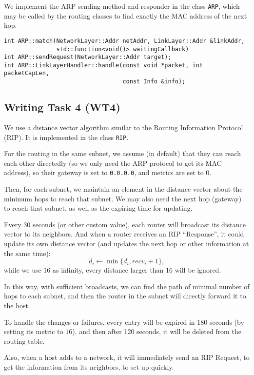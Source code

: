 \documentclass[a4paper]{article}
\begin{document}
  We implement the ARP sending method and responder in the class \texttt{ARP}, which may be called by the routing classes to find exactly the MAC address of the next hop.
  \begin{verbatim}
int ARP::match(NetworkLayer::Addr netAddr, LinkLayer::Addr &linkAddr,
               std::function<void()> waitingCallback)
int ARP::sendRequest(NetworkLayer::Addr target);
int ARP::LinkLayerHandler::handle(const void *packet, int packetCapLen,
                                  const Info &info);
  \end{verbatim}

  \subsection{Writing Task 4 (WT4)}
  
  We use a distance vector algorithm similar to the Routing Information Protocol (RIP). It is implemented in the class \texttt{RIP}.

  For the routing in the same subnet, we assume (in default) that they can reach each other directedly (so we only need the ARP protocol to get its MAC address), so their gateway is set to \texttt{0.0.0.0}, and metrics are set to $0$.

  Then, for each subnet, we maintain an element in the distance vector about the minimum hops to reach that subnet.
  We may also need the next hop (gateway) to reach that subnet, as well as the expiring time for updating.

  Every 30 seconds (or other custom value), each router will broadcast its distance vector to its neighbors.
  And when a router receives an RIP ``Response'', it could update its own distance vector (and updates the next hop or other information at the same time):
  $$d_i \gets \min\{d_i, \mathit{recv}_i + 1\},$$
  while we use $16$ as infinity, every distance larger than $16$ will be ignored.

  In this way, with sufficient broadcasts, we can find the path of minimal number of hops to each subnet, and then the router in the subnet will directly forward it to the host.

  To handle the changes or failures, every entry will be expired in 180 seconds (by setting its metric to $16$), and then after 120 seconds, it will be deleted from the routing table.

  Also, when a host adds to a network, it will immediately send an RIP Request, to get the information from its neighbors, to set up quickly.
\end{document}
